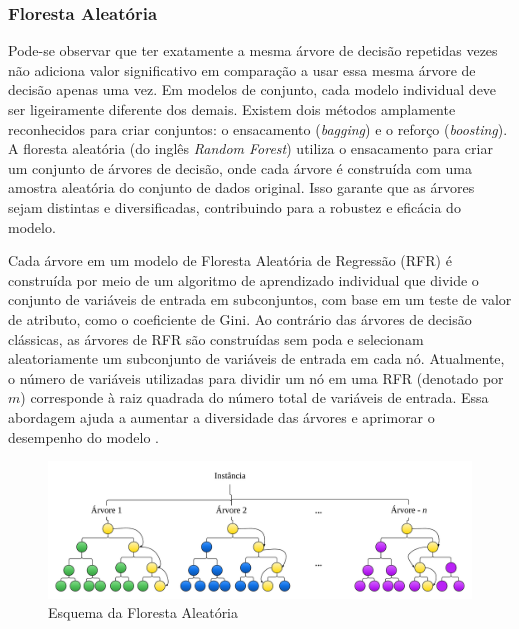 \subsubsection{Floresta Aleat\'oria } \label{subsubsec:rf}

Pode-se observar que ter exatamente a mesma árvore de decisão repetidas vezes não adiciona valor significativo em comparação a usar essa mesma árvore de decisão apenas uma vez. Em modelos de conjunto, cada modelo individual deve ser ligeiramente diferente dos demais. Existem dois métodos amplamente reconhecidos para criar conjuntos: o ensacamento (\textit{bagging}) e o reforço (\textit{boosting}). A floresta aleatória (do inglês \textit{Random Forest}) utiliza o ensacamento para criar um conjunto de árvores de decisão, onde cada árvore é construída com uma amostra aleatória do conjunto de dados original. Isso garante que as árvores sejam distintas e diversificadas, contribuindo para a robustez e eficácia do modelo.



Cada árvore em um modelo de Floresta Aleatória de Regressão (RFR) é construída por meio de um algoritmo de aprendizado individual que divide o conjunto de variáveis de entrada em subconjuntos, com base em um teste de valor de atributo, como o coeficiente de Gini. Ao contrário das árvores de decisão clássicas, as árvores de RFR são construídas sem poda e selecionam aleatoriamente um subconjunto de variáveis de entrada em cada nó. Atualmente, o número de variáveis utilizadas para dividir um nó em uma RFR (denotado por $m$) corresponde à raiz quadrada do número total de variáveis de entrada. Essa abordagem ajuda a aumentar a diversidade das árvores e aprimorar o desempenho do modelo \cite{Pelletier2016156}.

\begin{figure}[!htb]
	\centering
	\caption{Esquema da Floresta Aleatória}
	\label{fig:rf}
	\includegraphics[width=1\linewidth]{Modelos/Figuras/RF}
	
\end{figure}


